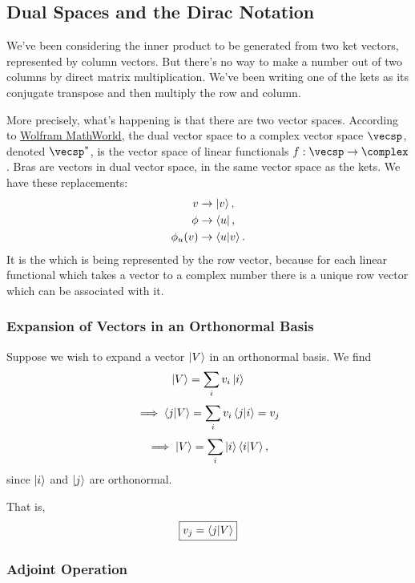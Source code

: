 \subsection{Dual Spaces and the Dirac Notation}

We've been considering the inner product to be generated from two ket vectors, represented by column vectors. But there's no way to make a number out of two columns by direct matrix multiplication. We've been writing one of the kets as its conjugate transpose and then multiply the row and column.

More precisely, what's happening is that there are two vector spaces. According to \href{http://mathworld.wolfram.com/DualVectorSpace.html}{Wolfram MathWorld}, the dual vector space to a complex vector space $\vecsp$, denoted $\vecsp^*$, is the vector space of linear functionals $f : \vecsp \rightarrow \complex$. Bras are vectors in  dual vector space,  in the same vector space as the kets. We have these replacements:
\begin{align*}
    v &\rightarrow \ket{v}, \\
    \phi &\rightarrow \bra{u}, \\
    \phi_u(v) &\rightarrow \braket{u}{v}.
\end{align*}
It is the  which is being represented by the row vector, because for each linear functional which takes a vector to a complex number there is a unique row vector which can be associated with it.

\subsubsection{Expansion of Vectors in an Orthonormal Basis}

Suppose we wish to expand a vector $\ket{V}$ in an orthonormal basis. We find
    $$\ket{V} = \sum_i v_i \ket{i}$$
    $$\implies \braket{j}{V} = \sum_i v_i \braket{j}{i} = v_j$$
    $$\implies \ket{V} = \sum_i \ket{i} \braket{i}{V},$$
since $\ket{i}$ and $\ket{j}$ are orthonormal.

That is,
\begin{equation}\label{component formula}
    \boxed{v_j = \braket{j}{V}}
\end{equation}

\subsubsection{Adjoint Operation}

